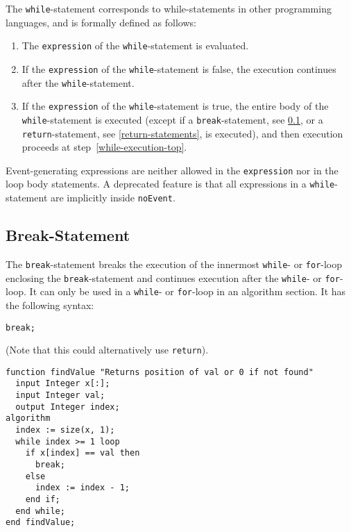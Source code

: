 The \lstinline!while!-statement corresponds to while-statements in other programming languages, and is formally defined as follows:
\begin{enumerate}
\item
  \label{while-execution-top}
  The \lstinline!expression! of the \lstinline!while!-statement is evaluated.
\item
  If the \lstinline!expression! of the \lstinline!while!-statement is false, the execution continues after the \lstinline!while!-statement.
\item
  If the \lstinline!expression! of the \lstinline!while!-statement is true, the entire body of the \lstinline!while!-statement is executed (except if a \lstinline!break!-statement, see \cref{break-statement}, or a \lstinline!return!-statement, see \cref{return-statements}, is executed), and then execution proceeds at step~\ref{while-execution-top}.
\end{enumerate}

Event-generating expressions are neither allowed in the \lstinline!expression! nor in the loop body statements.
A deprecated feature is that all expressions in a \lstinline!while!-statement are implicitly inside \lstinline!noEvent!.

\subsection{Break-Statement}\label{break-statement}

The \lstinline!break!-statement breaks the execution of the innermost \lstinline!while!- or \lstinline!for!-loop enclosing the \lstinline!break!-statement and continues execution after the \lstinline!while!- or \lstinline!for!-loop.
It can only be used in a \lstinline!while!- or \lstinline!for!-loop in an algorithm section.
It has the following syntax:
\begin{lstlisting}[language=modelica]
break;
\end{lstlisting}

\begin{example}
(Note that this could alternatively use \lstinline!return!).
\begin{lstlisting}[language=modelica]
function findValue "Returns position of val or 0 if not found"
  input Integer x[:];
  input Integer val;
  output Integer index;
algorithm
  index := size(x, 1);
  while index >= 1 loop
    if x[index] == val then
      break;
    else
      index := index - 1;
    end if;
  end while;
end findValue;
\end{lstlisting}
\end{example}

